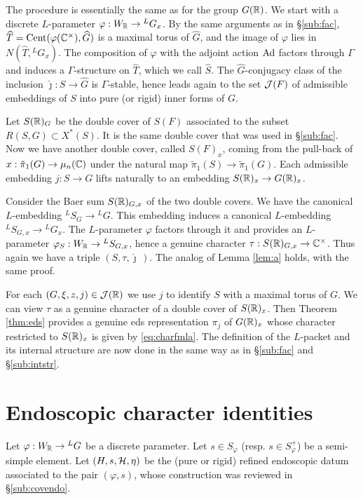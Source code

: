 \documentclass{article}
\theoremstyle{definition}
\numberwithin{equation}{section}
\renewcommand{\-}{\hyp{}}
\begin{document}
The procedure is essentially the same as for the group $G(\mathbb{R})$. We start with a discrete $L$\-parameter $\varphi : W_{\mathbb{R}} \to {^LG_x}$. By the same arguments as in \S\ref{sub:fac}, $\widehat T = \textrm{Cent}(\varphi(\mathbb{C}^\times),\widehat G)$ is a maximal torus of $\hat G$, and the image of $\varphi$ lies in $N(\hat T,{^LG_x})$. The composition of $\varphi$ with the adjoint action $\textrm{Ad}$ factors through $\Gamma$ and induces a $\Gamma$-structure on $\hat T$, which we call 
$\hat S$. The $\hat G$-conjugacy class of the inclusion $\hat\jmath : \hat S \to \hat G$ is $\Gamma$-stable, hence leads again to the set $\mathcal{J}(F)$ of admissible embeddings of $S$ into pure (or rigid) inner forms of $G$.

Let $S(\mathbb{R})_G$ be the double cover of $S(F)$ associated to the subset $R(S,G) \subset X^*(S)$. It is the same double cover that was used in \S\ref{sub:fac}. Now we have another double cover, called $S(F)_x$, coming from the pull-back of $x : \tilde\pi_1(G) \to \mu_n(\mathbb{C})$ under the natural map $\tilde\pi_1(S) \to \tilde\pi_1(G)$. Each admissible embedding $j : S \to G$ lifts naturally to an embedding $S(\mathbb{R})_x \to G(\mathbb{R})_x$.

Consider the Baer sum $S(\mathbb{R})_{G,x}$ of the two double covers. We have the canonical $L$\-embedding $^LS_G \to {^LG}$. This embedding induces a canonical $L$\-embedding ${^LS_{G,x}} \to {^LG_x}$. The $L$-parameter $\varphi$ factors through it and provides an $L$-parameter $\varphi_S : W_{\mathbb{R}} \to {^LS_{G,x}}$, hence a genuine character $\tau : S(\mathbb{R})_{G,x} \to \mathbb{C}^\times$. Thus again we have a triple $(S,\tau,\hat\jmath\,)$. The analog of Lemma \ref{lem:a} holds, with the same proof.

For each $(G,\xi,z,j) \in \mathcal{J}(\mathbb{R})$ we use $j$ to identify $S$ with a maximal torus of $G$. We can view $\tau$ as a genuine character of a double cover of $S(\mathbb{R})_x$. Then Theorem \ref{thm:eds} provides a genuine eds representation $\pi_j$ of $G(\mathbb{R})_x$ whose character restricted to $S(\mathbb{R})_x$ is given by \eqref{eq:charfmla}. The definition of the $L$-packet and its internal structure are now done in the same way as in \S\ref{sub:fac} and \S\ref{sub:intstr}.



\section{Endoscopic character identities} \label{sec:endo}

Let $\varphi : W_{\mathbb{R}} \to {^LG}$ be a discrete parameter. Let $s \in S_\varphi$ (resp. $s \in S_\varphi^+$) be a semi-simple element. Let $(H,s,\mathcal{H},\eta)$ be the (pure or rigid) refined endoscopic datum associated to the pair $(\varphi,s)$, whose construction was reviewed in \S\ref{sub:covendo}.
\end{document}
